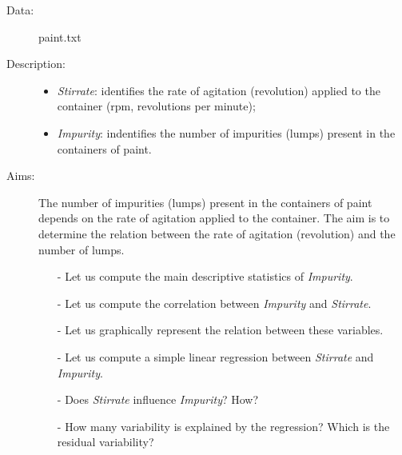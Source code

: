 

\begin{frame}
  \begin{description}
    \item[Data: ]paint.txt \\ 
    \item[Description: ]
      \begin{footnotesize}
        \begin{itemize}
          \item \textit{Stirrate}: identifies the rate of agitation (revolution) applied to the container (rpm, revolutions per minute);
          \item \textit{Impurity}: indentifies the number of impurities (lumps) present in the containers of paint.
        \end{itemize}
      \end{footnotesize}
    \item[Aims: ]
      \begin{footnotesize}
        The number of impurities (lumps) present in the containers of paint depends on the rate of agitation applied to the container. The aim is to determine the relation between the rate of agitation (revolution) and the number of lumps.
        \begin{itemize}
          \item[-] Let us compute the main descriptive statistics of \textit{Impurity}.
          \item[-] Let us compute the correlation between \textit{Impurity} and \textit{Stirrate}.
          \item[-] Let us graphically represent the relation between these variables.
          \item[-] Let us compute a simple linear regression between \textit{Stirrate} and \textit{Impurity}.
          \item[-] Does \textit{Stirrate} influence \textit{Impurity}? How?
          \item[-] How many variability is explained by the regression? Which is the residual variability?  
        \end{itemize}
      \end{footnotesize}
  \end{description}
\end{frame}

